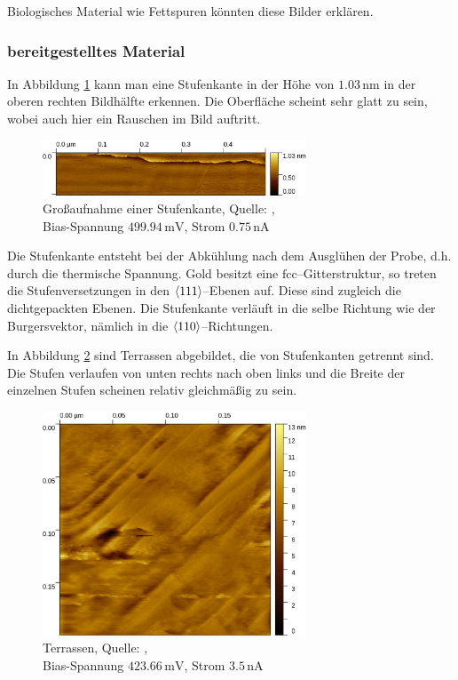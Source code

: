 \documentclass[12pt,a4paper]{scrartcl}
\numberwithin{equation}{section} %
\begin{document}
Biologisches Material wie Fettspuren könnten diese Bilder erklären.

\newpage
\hypertarget{bereitgestelltes-material}{%
\subsubsection{bereitgestelltes
Material}\label{bereitgestelltes-material}}

In Abbildung \ref{abb:Gold Stufenkante} kann man eine Stufenkante in der Höhe von $1.03\mathrm{\,nm}$ in der oberen rechten Bildhälfte erkennen. Die Oberfläche scheint sehr glatt zu sein, wobei auch hier ein Rauschen im Bild auftritt.

\begin{figure}[ht]
	\centering
	\includegraphics[width=0.7\textwidth]{../media/B2.5/Stufenkante.pdf}
	\caption{Großaufnahme einer Stufenkante, Quelle: \cite{Grover}, \\
			Bias-Spannung $499.94 \mathrm{\,mV}$, Strom $0.75 \mathrm{\,nA}$}
	\label{abb:Gold Stufenkante}
\end{figure}

Die Stufenkante entsteht bei der Abkühlung nach dem Ausglühen der Probe, d.h. durch die thermische Spannung. Gold besitzt eine $\mathrm{fcc}$--Gitterstruktur, so treten die Stufenversetzungen in den $\expval{111}$--Ebenen auf. Diese sind zugleich die dichtgepackten Ebenen. Die Stufenkante verläuft in die selbe Richtung wie der Burgersvektor, nämlich in die $\expval{110}$--Richtungen.

In Abbildung \ref{abb:Gold terassen} sind Terrassen abgebildet, die von Stufenkanten getrennt sind. Die Stufen verlaufen von unten rechts nach oben links und die Breite der einzelnen Stufen scheinen relativ gleichmäßig zu sein.

\begin{figure}[ht]
	\centering
	\includegraphics[width=0.7\textwidth]{../media/B2.5/Gold.pdf}
	\caption{Terrassen, Quelle: \cite{Grover}, \\
			Bias-Spannung $423.66 \mathrm{\,mV}$, Strom $3.5 \mathrm{\,nA}$}
	\label{abb:Gold terassen}
\end{figure}
\end{document}
